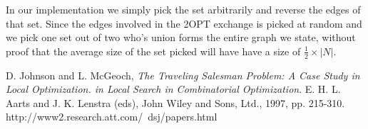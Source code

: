 \documentclass[a4paper,12pt,oneside]{article}
\begin{document}
In our implementation we simply pick the set arbitrarily and reverse the edges of that set. Since the edges involved in the 2OPT exchange is picked at random and we pick one set out of two who's union forms the entire graph we state, without proof that the average size of the set picked will have have a size of $\frac{1}{2} \times |N|$.



\begin{thebibliography}{9}

	D. Johnson and L. McGeoch,
	\emph{The Traveling Salesman Problem: A Case Study in Local Optimization. in Local Search in Combinatorial Optimization}.
	E. H. L. Aarts and J. K. Lenstra (eds), John Wiley and Sons, Ltd., 1997, pp. 215-310. http://www2.research.att.com/~dsj/papers.html

\end{thebibliography}
\end{document}
